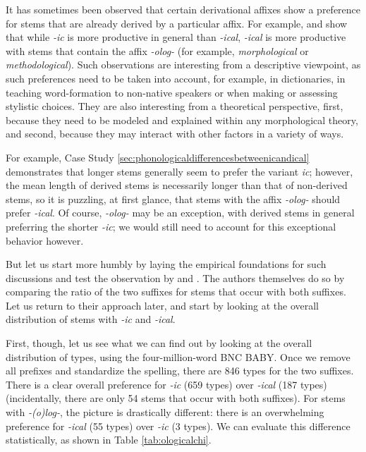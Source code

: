 It has sometimes been observed that certain derivational affixes show a preference for stems that are already derived by a particular affix. For example, \citet{lindsay_rival_2011} and \citet{lindsay_natural_2013} show that while \textit{-ic} is more productive in general than \textit{-ical}, \textit{-ical} is more productive with stems that contain the affix \textit{-olog-} (for example, \textit{morphological} or \textit{methodological}). Such observations are  interesting from a descriptive viewpoint, as such preferences need to be taken into account, for example, in dictionaries, in teaching word-formation to non-native speakers or when making or assessing stylistic choices. They are also interesting from a theoretical perspective, first, because they need to be modeled and explained within any morphological theory, and second, because they may interact with other factors in a variety of ways.

For example, Case Study \ref{sec:phonologicaldifferencesbetweenicandical} demonstrates that longer stems generally seem to prefer the variant \textit{ic}; however, the mean length of derived stems is necessarily longer than that of non-derived stems, so it is puzzling, at first glance, that stems with the affix \textit{-olog-} should prefer \textit{-ical}. Of course, \textit{-olog-} may be an exception, with derived stems in general preferring the shorter \textit{-ic}; we would still need to account for this exceptional behavior however.

But let us start more humbly by laying the empirical foundations for such discussions and test the observation by \citet{lindsay_rival_2011} and \citet{lindsay_natural_2013}. The authors themselves do so by comparing the ratio of the two suffixes for stems that occur with both suffixes. Let us return to their approach later, and start by looking at the overall distribution of stems with \textit{-ic} and \textit{-ical}. 

First, though, let us see what we can find out by looking at the overall distribution of types, using the four-million-word BNC BABY. Once we remove all prefixes and standardize the spelling, there are 846 types for the two suffixes. There is a clear overall preference for \textit{-ic} (659 types) over \textit{-ical} (187 types) (incidentally, there are only 54 stems that occur with both suffixes). For stems with \textit{-(o)log-}, the picture is drastically different: there is an overwhelming preference for \textit{-ical} (55 types) over \textit{-ic} (3 types). We can evaluate this difference statistically, as shown in Table \ref{tab:ologicalchi}.

